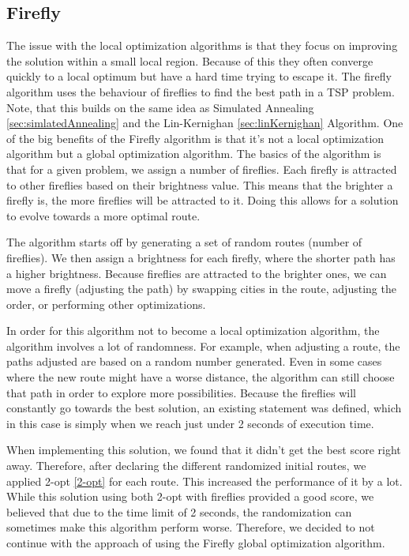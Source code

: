 \documentclass{article}
\begin{document}
\subsection{Firefly} \label{firefly}
The issue with the local optimization algorithms is that they focus on improving the solution within a small local region. Because of this they often converge quickly to a local optimum but have a hard time trying to escape it. The firefly algorithm \cite{kumbharana2013solving} uses the behaviour of fireflies to find the best path in a TSP problem. Note, that this builds on the same idea as Simulated Annealing \ref{sec:simlatedAnnealing} and the Lin-Kernighan \ref{sec:linKernighan} Algorithm. One of the big benefits of the Firefly algorithm is that it's not a local optimization algorithm but a global optimization algorithm. The basics of the algorithm is that for a given problem, we assign a number of fireflies. Each firefly is attracted to other fireflies based on their brightness value. This means that the brighter a firefly is, the more fireflies will be attracted to it. Doing this allows for a solution to evolve towards a more optimal route.

The algorithm starts off by generating a set of random routes (number of fireflies). We then assign a brightness for each firefly, where the shorter path has a higher brightness. Because fireflies are attracted to the brighter ones, we can move a firefly (adjusting the path) by swapping cities in the route, adjusting the order, or performing other optimizations.

In order for this algorithm not to become a local optimization algorithm, the algorithm involves a lot of randomness. For example, when adjusting a route, the paths adjusted are based on a random number generated. Even in some cases where the new route might have a worse distance, the algorithm can still choose that path in order to explore more possibilities. Because the fireflies will constantly go towards the best solution, an existing statement was defined, which in this case is simply when we reach just under 2 seconds of execution time.

When implementing this solution, we found that it didn't get the best score right away. Therefore, after declaring the different randomized initial routes, we applied 2-opt \ref{2-opt} for each route. This increased the performance of it by a lot. While this solution using both 2-opt with fireflies provided a good score, we believed that due to the time limit of 2 seconds, the randomization can sometimes make this algorithm perform worse. Therefore, we decided to not continue with the approach of using the Firefly global optimization algorithm.
\end{document}

